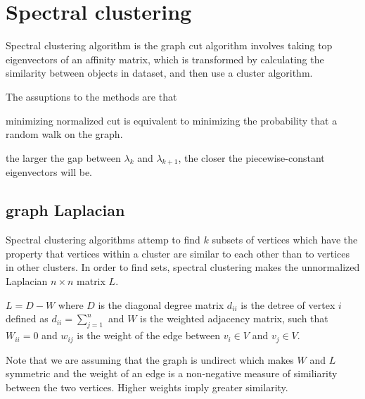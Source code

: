 \section{Spectral clustering}
Spectral clustering algorithm is the graph cut algorithm involves taking top eigenvectors of an affinity matrix, which is transformed by calculating the similarity between objects in dataset, and then use a cluster algorithm.

The assuptions to the methods are that \begin{inparaenum}
\item minimizing normalized cut is equivalent to minimizing the probability that a random walk on the graph.
\item the larger the gap between $\lambda_{k}$ and $\lambda_{k+1}$, the closer the piecewise-constant eigenvectors will be.
\end{inparaenum}

\subsection{graph Laplacian}
Spectral clustering algorithms attemp to find $k$ subsets of vertices which have the property that vertices within a cluster are similar to each other than to vertices in other clusters. In order to find sets, spectral clustering makes the unnormalized Laplacian $n \times n$ matrix $L$.

$L = D - W$ where $D$ is the diagonal degree matrix $d_{ii}$ is the detree of vertex $i$ defined as $d_{ii} = \sum_{j=1}^n$ and $W$ is the weighted adjacency matrix, such that $W_{ii} = 0$ and $w_{ij}$ is the weight of the edge between $v_i \in V$ and $v_j \in V$.

Note that we are assuming that the graph is undirect which makes $W$ and $L$ symmetric and the weight of an edge is a non-negative measure of similiarity between the two vertices. Higher weights imply greater similarity.


